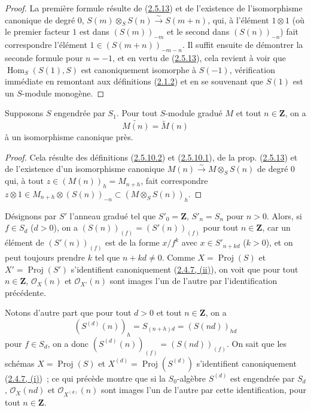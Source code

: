 \begin{proof}
La première formule résulte de (\hyperref[II.2.5.13-fr]{2.5.13}) et de
l'existence de l'isomorphisme canonique de degré $0$,
$S(m)\otimes_S S(n)\xrightarrow{\sim}S(m+n)$, qui, à l'élément
$1\otimes 1$ (où le premier facteur $1$ est dans $(S(m))_{-m}$ et le second
dans $(S(n))_{-n}$) fait correspondre l'élément
$1\in(S(m+n))_{-m-n}$. Il suffit ensuite de démontrer la seconde formule
pour $n=-1$, et en vertu de (\hyperref[II.2.5.13-fr]{2.5.13}), cela revient
à voir que $\operatorname{Hom}_S(S(1),S)$ est canoniquement isomorphe à
$S(-1)$, vérification immédiate en remontant aux définitions
(\hyperref[II.2.1.2-fr]{2.1.2}) et en se souvenant que $S(1)$ est un
$S$-module monogène.
\end{proof}

\begin{corollary}[2.5.15]
\label{II.2.5.15-fr}
Supposons $S$ engendrée par $S_1$. Pour tout $S$-module gradué $M$ et
tout $n\in\mathbf{Z}$, on a
\[
\label{II.2.5.15.1-fr}
  \widetilde{M(n)}=\widetilde{M}(n)
\tag{2.5.15.1}
\]
à un isomorphisme canonique près.
\end{corollary}

\begin{proof}
Cela résulte des définitions (\hyperref[II.2.5.10.2-fr]{2.5.10.2}) et
(\hyperref[II.2.5.10.1-fr]{2.5.10.1}), de la prop.
(\hyperref[II.2.5.13-fr]{2.5.13}) et de l'existence d'un isomorphisme
canonique $M(n)\xrightarrow{\sim}M\otimes_S S(n)$ de degré $0$ qui, à tout
$z\in(M(n))_h=M_{n+h}$, fait correspondre
$z\otimes1\in M_{n+h}\otimes(S(n))_{-n}\subset(M\otimes_S S(n))_h$.
\end{proof}

\begin{env}[2.5.16]
\label{II.2.5.16-fr}
Désignons par $S'$ l'anneau gradué tel que $S'_0=\mathbf{Z}$,
$S'_n=S_n$ pour $n>0$. Alors, si $f\in S_d$ ($d>0$), on a
$(S(n))_{(f)}=(S'(n))_{(f)}$ pour tout $n\in\mathbf{Z}$, car un élément de
$(S'(n))_{(f)}$ est de la forme $x/f^k$ avec $x\in S'_{n+kd}$ ($k>0$), et
on peut toujours prendre $k$ tel que $n+kd\neq0$. Comme
$X=\operatorname{Proj}(S)$ et $X'=\operatorname{Proj}(S')$ s'identifient
canoniquement (\hyperref[II.2.4.7-fr]{2.4.7, (ii)}), on voit que pour tout
$n\in\mathbf{Z}$, $\mathcal{O}_X(n)$ et $\mathcal{O}_{X'}(n)$ sont images
l'un de l'autre par l'identification précédente.

Notons d'autre part que pour tout $d>0$ et tout $n\in\mathbf{Z}$, on a
\[
  (S^{(d)}(n))_h=S_{(n+h)d}=(S(nd))_{hd}
\]
pour $f\in S_d$, on a donc $(S^{(d)}(n))_{(f)}=(S(nd))_{(f)}$. On sait que
les schémas $X=\operatorname{Proj}(S)$ et
$X^{(d)}=\operatorname{Proj}(S^{(d)})$ s'identifient canoniquement
(\hyperref[II.2.4.7-fr]{2.4.7, (i)})~; ce qui précède montre que si la
$S_0$-algèbre $S^{(d)}$ est engendrée par $S_d$, $\mathcal{O}_X(nd)$ et
$\mathcal{O}_{X^{(d)}}(n)$ sont images l'un de l'autre par cette
identification, pour tout $n\in\mathbf{Z}$.
\end{env}

